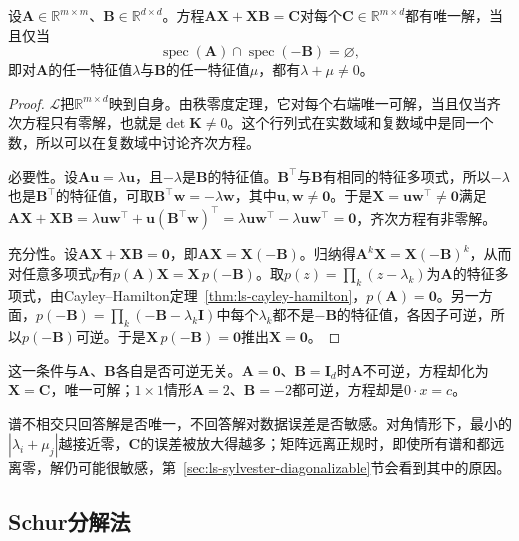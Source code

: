 \begin{theorem}[Sylvester方程的唯一可解性]
\label{thm:ls-sylvester-unique-solvability}
设$\bm A\in\mathbb R^{m\times m}$、$\bm B\in\mathbb R^{d\times d}$。方程$\bm A\bm X+\bm X\bm B=\bm C$对每个$\bm C\in\mathbb R^{m\times d}$都有唯一解，当且仅当
\begin{equation}
 \operatorname{spec}(\bm A)\cap\operatorname{spec}(-\bm B)=\varnothing ,
 \label{eq:ls-sylvester-spectral-separation}
\end{equation}
即对$\bm A$的任一特征值$\lambda$与$\bm B$的任一特征值$\mu$，都有$\lambda+\mu\neq0$。
\end{theorem}

\begin{proof}
$\mathcal L$把$\mathbb R^{m\times d}$映到自身。由秩零度定理，它对每个右端唯一可解，当且仅当齐次方程只有零解，也就是$\det\bm K\neq0$。这个行列式在实数域和复数域中是同一个数，所以可以在复数域中讨论齐次方程。

必要性。设$\bm A\bm u=\lambda\bm u$，且$-\lambda$是$\bm B$的特征值。$\bm B^\top$与$\bm B$有相同的特征多项式，所以$-\lambda$也是$\bm B^\top$的特征值，可取$\bm B^\top\bm w=-\lambda\bm w$，其中$\bm u,\bm w\neq\bm0$。于是$\bm X=\bm u\bm w^\top\neq\bm0$满足$\bm A\bm X+\bm X\bm B=\lambda\bm u\bm w^\top+\bm u(\bm B^\top\bm w)^\top=\lambda\bm u\bm w^\top-\lambda\bm u\bm w^\top=\bm0$，齐次方程有非零解。

充分性。设$\bm A\bm X+\bm X\bm B=\bm0$，即$\bm A\bm X=\bm X(-\bm B)$。归纳得$\bm A^k\bm X=\bm X(-\bm B)^k$，从而对任意多项式$p$有$p(\bm A)\bm X=\bm X\,p(-\bm B)$。取$p(z)=\prod_k(z-\lambda_k)$为$\bm A$的特征多项式，由Cayley--Hamilton定理~\ref{thm:ls-cayley-hamilton}，$p(\bm A)=\bm0$。另一方面，$p(-\bm B)=\prod_k(-\bm B-\lambda_k\bm I)$中每个$\lambda_k$都不是$-\bm B$的特征值，各因子可逆，所以$p(-\bm B)$可逆。于是$\bm X\,p(-\bm B)=\bm0$推出$\bm X=\bm0$。
\end{proof}

这一条件与$\bm A$、$\bm B$各自是否可逆无关。$\bm A=\bm0$、$\bm B=\bm I_d$时$\bm A$不可逆，方程却化为$\bm X=\bm C$，唯一可解；$1\times1$情形$\bm A=2$、$\bm B=-2$都可逆，方程却是$0\cdot x=c$。

谱不相交只回答解是否唯一，不回答解对数据误差是否敏感。对角情形下，最小的$|\lambda_i+\mu_j|$越接近零，$\bm C$的误差被放大得越多；矩阵远离正规时，即使所有谱和都远离零，解仍可能很敏感，第~\ref{sec:ls-sylvester-diagonalizable}节会看到其中的原因。

\subsection{Schur分解法}
\label{sec:ls-sylvester-schur}

